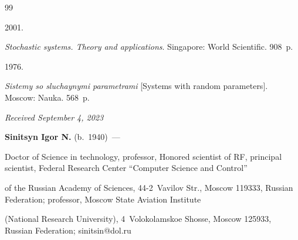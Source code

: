 {{\begin{thebibliography}{99}

 2001. 

\textit{Stochastic systems. Theory and applications}. Singapore: World Scientific. 908~p.







 1976. 

\textit{Sistemy so sluchaynymi parametrami} [Systems with random parameters]. Moscow: Nauka. 568~p.

\end{thebibliography}

} }



\vspace*{-6pt}



\hfill{\small\textit{Received September 4, 2023}} 



\vspace*{-14pt} 



\Contrl



\vspace*{-3pt}

    









\noindent

\textbf{Sinitsyn Igor N.} (b.\ 1940)~--- 

Doctor of Science in technology, professor, Honored scientist of RF, principal scientist, Federal Research Center ``Computer Science and Control'' 

of the Russian Academy of Sciences, 44-2~Vavilov Str., Moscow 119333, Russian Federation; professor, Moscow State Aviation Institute 

(National Research University), 4~Volokolamskoe Shosse, Moscow 125933, Russian Federation; \mbox{sinitsin@dol.ru}







  

\label{end\stat}



\renewcommand{\bibname}{\protect\rm Литература} 

